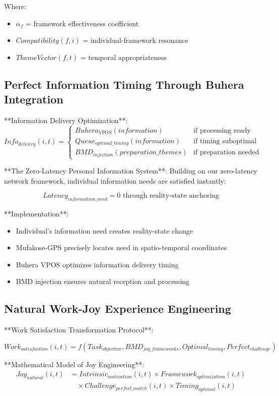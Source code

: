 \documentclass[12pt,a4paper]{article}
\begin{document}
Where:
\begin{itemize}
\item $\alpha_f$ = framework effectiveness coefficient
\item $Compatibility(f,i)$ = individual-framework resonance
\item $ThemeVector(f,t)$ = temporal appropriateness
\end{itemize}

\subsection{Perfect Information Timing Through Buhera Integration}

**Information Delivery Optimization**:
$$Info_{delivery}(i,t) = \begin{cases}
Buhera_{VPOS}(information) & \text{if processing ready}\\
Queue_{optimal\_timing}(information) & \text{if timing suboptimal}\\
BMD_{injection}(preparation\_themes) & \text{if preparation needed}
\end{cases}$$

**The Zero-Latency Personal Information System**:
Building on our zero-latency network framework, individual information needs are satisfied instantly:

$$Latency_{information\_need} = 0 \text{ through reality-state anchoring}$$

**Implementation**:
\begin{itemize}
\item Individual's information need creates reality-state change
\item Mufakose-GPS precisely locates need in spatio-temporal coordinates
\item Buhera VPOS optimizes information delivery timing
\item BMD injection ensures natural reception and processing
\end{itemize}

\subsection{Natural Work-Joy Experience Engineering}

**Work Satisfaction Transformation Protocol**:

$$Work_{satisfaction}(i,t) = f(Task_{objective}, BMD_{joy\_frameworks}, Optimal_{timing}, Perfect_{challenge})$$

**Mathematical Model of Joy Engineering**:
\begin{align}
Joy_{natural}(i,t) &= Intrinsic_{motivation}(i,t) \times Framework_{optimization}(i,t)\\
&\quad \times Challenge_{perfect\_match}(i,t) \times Timing_{optimal}(i,t)
\end{align}
\end{document}
